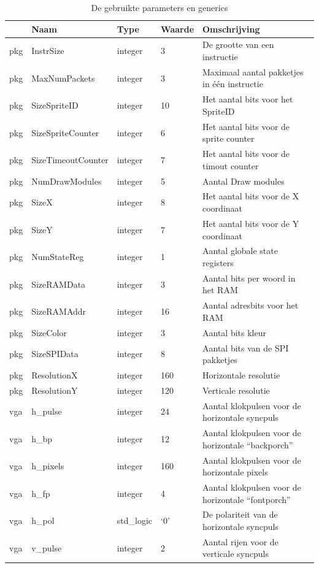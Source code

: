 \documentclass{scrreprt} %
\begin{document}
\begin{table}[H]
\centering
\caption{De gebruikte parameters en generics}
\label{tab:spec-params}
\begin{tabular}{l l l l l}
	\hline\hline
 	 & Naam & Type & Waarde & Omschrijving\\
 	\hline
	pkg & InstrSize & integer & 3 & De grootte van een instructie\\ 
	pkg & MaxNumPackets & integer & 3 & Maximaal aantal pakketjes in één instructie\\ 
	pkg & SizeSpriteID & integer & 10 & Het aantal bits voor het SpriteID \\
	pkg & SizeSpriteCounter & integer & 6 & Het aantal bits voor de sprite counter\\
	pkg & SizeTimeoutCounter & integer & 7 & Het aantal bits voor de timout counter\\
	pkg & NumDrawModules & integer & 5 & Aantal Draw modules\\ 
	pkg & SizeX & integer & 8 & Het aantal bits voor de X coordinaat\\
	pkg & SizeY & integer & 7 & Het aantal bits voor de Y coordinaat\\
	pkg & NumStateReg & integer & 1 & Aantal globale state registers\\
	pkg & SizeRAMData & integer & 3 & Aantal bits per woord in het RAM\\
	pkg & SizeRAMAddr & integer & 16 & Aantal adresbits voor het RAM\\
	pkg & SizeColor & integer & 3 & Aantal bits kleur\\
	pkg & SizeSPIData & integer & 8 & Aantal bits van de SPI pakketjes\\
	pkg & ResolutionX & integer & 160 & Horizontale resolutie \\
	pkg & ResolutionY & integer & 120 & Verticale resolutie \\
	vga & h\_pulse & integer & 24 & Aantal klokpulsen voor de horizontale syncpuls\\ 
	vga & h\_bp & integer & 12 & Aantal klokpulsen voor de horizontale “backporch” \\ 
	vga & h\_pixels & integer & 160 & Aantal klokpulsen voor de horizontale pixels \\ 
	vga & h\_fp & integer & 4 & Aantal klokpulsen voor de horizontale “fontporch” \\ 
	vga & h\_pol & std\_logic & ‘0’ & De polariteit van de horizontale syncpuls\\ 
	vga & v\_pulse & integer & 2 & Aantal rijen voor de verticale syncpuls\\ 

\end{tabular}
\end{table}
\end{document}
